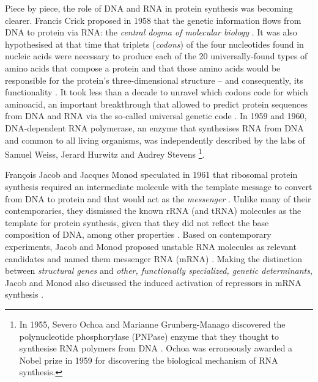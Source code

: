Piece by piece, the role of DNA and RNA in protein synthesis was becoming clearer. Francis Crick proposed in 1958 that the genetic information flows from DNA to protein via RNA: the \emph{central dogma of molecular biology} \cite{crick:1958ws,crick:1970aa}. It was also hypothesised at that time that triplets (\emph{codons}) of the four nucleotides found in nucleic acids were necessary to produce each of the 20 universally-found types of amino acids that compose a protein \cite{crick:1958ws,crick:1961ui} and that those amino acids would be responsible for the protein's three-dimensional structure -- and consequently, its functionality \cite{crick:1958ws}. It took less than a decade to unravel which codons code for which aminoacid, an important breakthrough that allowed to predict protein sequences from DNA and RNA via the so-called universal genetic code \cite{khorana:1966vr,crick:1968wg}. %
In 1959 and 1960, DNA-dependent RNA polymerase, an enzyme that synthesises RNA from DNA and common to all living organisms, was independently described by the labs of Samuel Weiss, Jerard Hurwitz and Audrey Stevens \cite{hurwitz:1960uf,weiss:1959vp,stevens:1960ue} \footnote{In 1955, Severo Ochoa and Marianne Grunberg-Manago discovered the polynucleotide phosphorylase (PNPase) enzyme that they thought to synthesise RNA polymers from DNA \cite{grunberg-manago:1956wb}. Ochoa was erroneously awarded a Nobel prize in 1959 for discovering the biological mechanism of RNA synthesis.}.


François Jacob and Jacques Monod speculated in 1961 that ribosomal protein synthesis required an intermediate molecule with the template message to convert from DNA to protein and that would act as the \emph{messenger} \cite{jacob:1961uh,brenner:1961ve}. Unlike many of their contemporaries, they dismissed the known rRNA (and tRNA) molecules as the template for protein synthesis, given that they did not reflect the base composition of DNA, among other properties \cite{jacob:1961uh}. Based on contemporary experiments, Jacob and Monod proposed unstable RNA molecules as relevant candidates and named them messenger RNA (mRNA) \cite{jacob:1961uh,brenner:1961ve}. Making the distinction between \emph{structural genes} and \emph{other, functionally specialized, genetic determinants}, Jacob and Monod also discussed the induced activation of repressors in mRNA synthesis \cite{jacob:1961uh}.

